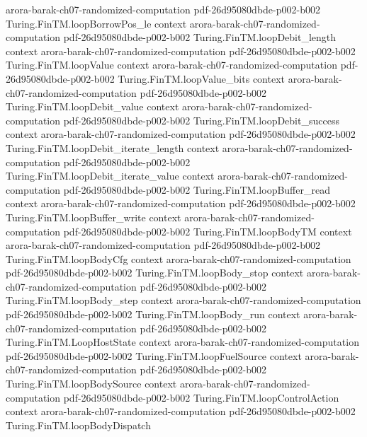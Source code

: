 \begin{theorem}
  {arora-barak-ch07-randomized-computation}
  {pdf-26d95080dbde-p002-b002}
\proofstep
  {Turing.FinTM.loopBorrowPos_le}
  {context}
  {arora-barak-ch07-randomized-computation}
  {pdf-26d95080dbde-p002-b002}
\proofstep
  {Turing.FinTM.loopDebit_length}
  {context}
  {arora-barak-ch07-randomized-computation}
  {pdf-26d95080dbde-p002-b002}
\proofstep
  {Turing.FinTM.loopValue}
  {context}
  {arora-barak-ch07-randomized-computation}
  {pdf-26d95080dbde-p002-b002}
\proofstep
  {Turing.FinTM.loopValue_bits}
  {context}
  {arora-barak-ch07-randomized-computation}
  {pdf-26d95080dbde-p002-b002}
\proofstep
  {Turing.FinTM.loopDebit_value}
  {context}
  {arora-barak-ch07-randomized-computation}
  {pdf-26d95080dbde-p002-b002}
\proofstep
  {Turing.FinTM.loopDebit_success}
  {context}
  {arora-barak-ch07-randomized-computation}
  {pdf-26d95080dbde-p002-b002}
\proofstep
  {Turing.FinTM.loopDebit_iterate_length}
  {context}
  {arora-barak-ch07-randomized-computation}
  {pdf-26d95080dbde-p002-b002}
\proofstep
  {Turing.FinTM.loopDebit_iterate_value}
  {context}
  {arora-barak-ch07-randomized-computation}
  {pdf-26d95080dbde-p002-b002}
\proofstep
  {Turing.FinTM.loopBuffer_read}
  {context}
  {arora-barak-ch07-randomized-computation}
  {pdf-26d95080dbde-p002-b002}
\proofstep
  {Turing.FinTM.loopBuffer_write}
  {context}
  {arora-barak-ch07-randomized-computation}
  {pdf-26d95080dbde-p002-b002}
\proofstep
  {Turing.FinTM.loopBodyTM}
  {context}
  {arora-barak-ch07-randomized-computation}
  {pdf-26d95080dbde-p002-b002}
\proofstep
  {Turing.FinTM.loopBodyCfg}
  {context}
  {arora-barak-ch07-randomized-computation}
  {pdf-26d95080dbde-p002-b002}
\proofstep
  {Turing.FinTM.loopBody_stop}
  {context}
  {arora-barak-ch07-randomized-computation}
  {pdf-26d95080dbde-p002-b002}
\proofstep
  {Turing.FinTM.loopBody_step}
  {context}
  {arora-barak-ch07-randomized-computation}
  {pdf-26d95080dbde-p002-b002}
\proofstep
  {Turing.FinTM.loopBody_run}
  {context}
  {arora-barak-ch07-randomized-computation}
  {pdf-26d95080dbde-p002-b002}
\proofstep
  {Turing.FinTM.LoopHostState}
  {context}
  {arora-barak-ch07-randomized-computation}
  {pdf-26d95080dbde-p002-b002}
\proofstep
  {Turing.FinTM.loopFuelSource}
  {context}
  {arora-barak-ch07-randomized-computation}
  {pdf-26d95080dbde-p002-b002}
\proofstep
  {Turing.FinTM.loopBodySource}
  {context}
  {arora-barak-ch07-randomized-computation}
  {pdf-26d95080dbde-p002-b002}
\proofstep
  {Turing.FinTM.loopControlAction}
  {context}
  {arora-barak-ch07-randomized-computation}
  {pdf-26d95080dbde-p002-b002}
\proofstep
  {Turing.FinTM.loopBodyDispatch}

\end{theorem}
